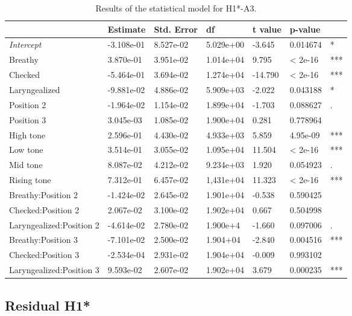 \documentclass[12pt, letterpaper]{article}
\providecommand{\lsptoprule}{\midrule\toprule}
\providecommand{\lspbottomrule}{\bottomrule\midrule}
\begin{document}
\begin{table}[!h]
  \centering
  \caption{Results of the statistical model for H1*-A3.}
  \label{tab:H1A3Results}
  \begin{tabular}{lllllll}
    \lsptoprule
     & Estimate & Std. Error & df & t value & p-value & \\ \hline
    \textit{Intercept} & -3.108e-01 & 8.527e-02 & 5.029e+00 & -3.645 & 0.014674 & * \\
    Breathy & 3.870e-01 & 3.951e-02 & 1.014e+04 & 9.795 & < 2e-16 & *** \\
    Checked & -5.464e-01 & 3.694e-02 & 1.274e+04 & -14.790 & < 2e-16 & *** \\
    Laryngealized & -9.881e-02 & 4.886e-02 & 5.909e+03 & -2.022 & 0.043188 & *  \\
    Position 2 & -1.964e-02 & 1.154e-02 & 1.899e+04 & -1.703 & 0.088627 & . \\
    Position 3 & 3.045e-03 & 1.085e-02 & 1.900e+04 & 0.281 & 0.778964 & \\
    High tone & 2.596e-01 & 4.430e-02 & 4.933e+03 & 5.859 & 4.95e-09 & ***  \\
    Low tone & 3.514e-01 & 3.055e-02 & 1.095e+04 & 11.504 & < 2e-16 & *** \\
    Mid tone & 8.087e-02 & 4.212e-02 & 9.234e+03 & 1.920 & 0.054923 & . \\
    Rising tone & 7.312e-01 & 6.457e-02 & 1,431e+04 & 11.323 & < 2e-16 & *** \\
    Breathy:Position 2 & -1.424e-02 & 2.645e-02 & 1.901e+04 & -0.538 & 0.590425 & \\
    Checked:Position 2 & 2.067e-02 & 3.100e-02 & 1.902e+04 & 0.667 & 0.504998 & \\
    Laryngealized:Position 2 & -4.614e-02 & 2.780e-02 & 1.900e+4 & -1.660 & 0.097006 & . \\
    Breathy:Position 3 & -7.101e-02 & 2.500e-02 & 1.904+04 & -2.840 & 0.004516 & *** \\
    Checked:Position 3 & -2.534e-04 & 2.931e-02 & 1.904e+04 & -0.009 & 0.993102 & \\
    Laryngealized:Position 3 & 9.593e-02 & 2.607e-02 & 1.902e+04 & 3.679 & 0.000235 & *** \\
    \lspbottomrule
  \end{tabular}
\end{table}

\subsection{Residual H1*} \label{sec:ResidH1}
\end{document}
